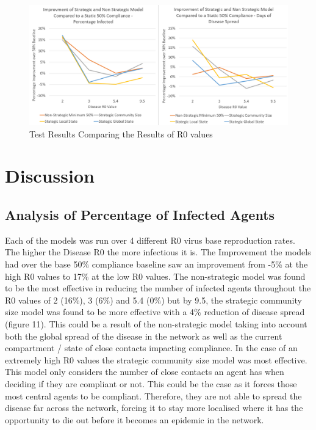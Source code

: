 \documentclass{article}
\begin{document}
\begin{figure}[h!]
\centering
\includegraphics[width=\textwidth]{1}
\caption{Test Results Comparing the Results of R0 values}
\end{figure}
\newpage


\section{Discussion}

\subsection{Analysis of Percentage of Infected Agents}

Each of the models was run over 4 different R0 virus base reproduction rates. The higher the Disease R0 the more infectious it is. The Improvement the models had over the base 50\% compliance baseline saw an improvement from -5\% at the high R0 values to 17\% at the low R0 values. The non-strategic model was found to be the most effective in reducing the number of infected agents throughout the R0 values of 2 (16\%), 3 (6\%) and 5.4 (0\%) but by 9.5, the strategic community size model was found to be more effective with a 4\% reduction of disease spread (figure 11). This could be a result of the non-strategic model taking into account both the global spread of the disease in the network as well as the current compartment / state of close contacts impacting compliance. In the case of an extremely high R0 values the strategic community size model was most effective.  This model only considers the number of close contacts an agent has when deciding if they are compliant or not. This could be the case as it forces those most central agents to be compliant. Therefore, they are not able to spread the disease far across the network, forcing it to stay more localised where it has the opportunity to die out before it becomes an epidemic in the network.\newline 
\end{document}
